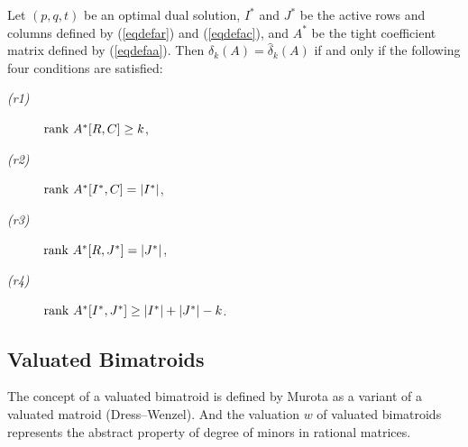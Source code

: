 \begin{proposition}
Let $ (p,q,t) $ be an optimal dual solution, 
$I^{\ast}$ and $ J^{\ast} $ be the active rows and columns defined by (\ref{eqdefar}) and (\ref{eqdefac}), 
and $ A^{\ast} $ be the tight coefficient matrix defined by (\ref{eqdefaa}). 
Then $ \delta_k (A) = \hat{\delta}_k (A) $ if and only if the following four conditions are satisfied:
\begin{description}
\item[{\em (r1)}] $ \mathrm{rank} \  A^{\ast} [ R ,C ] \ge k $,
\item[{\em (r2)}] $ \mathrm{rank} \  A^{\ast} [I^{\ast},C] = | I^{\ast} | $,
\item[{\em (r3)}] $ \mathrm{rank} \  A^{\ast} [ R , J^{\ast} ] = | J^{\ast} | $,
\item[{\em (r4)}] $ \mathrm{rank} \  A^{\ast} [ I^{\ast},J^{\ast} ] \ge | I^{\ast} | + |J^{\ast} | - k $.
\end{description}
\label{prop4r}
\end{proposition}

\subsection{Valuated Bimatroids}
\label{vb}
The concept of a valuated bimatroid is defined by Murota\cite{VB} 
as a variant of a valuated matroid (Dress--Wenzel\cite{VM1,VM2}). 
And the valuation $w$ of valuated bimatroids represents the abstract property of degree of minors in rational matrices.

